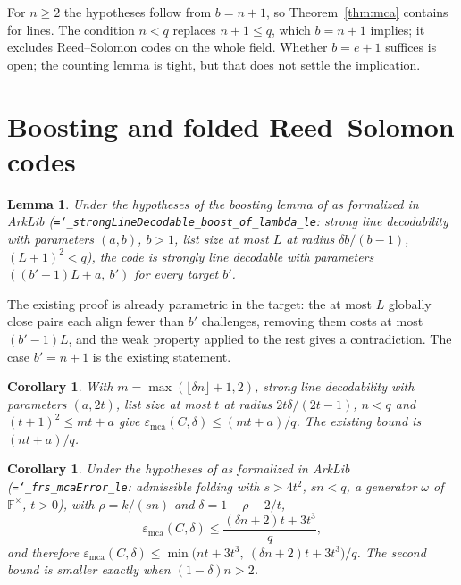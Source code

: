 \documentclass[11pt]{article}
\newtheorem{lemma}[theorem]{Lemma}
\newtheorem{corollary}[theorem]{Corollary}
\theoremstyle{definition}
\theoremstyle{remark}
\newcommand{\F}{\mathbb{F}}
\newcommand{\mca}{\varepsilon_{\mathrm{mca}}}
\newcommand{\lean}[1]{\texttt{\hyphenchar\font=`\_\relax #1}}
\begin{document}
For $n\ge2$ the hypotheses follow from $b=n+1$, so Theorem~\ref{thm:mca} contains
\cite[Thm.~3.5]{GG25} for lines. The condition $n<q$ replaces $n+1\le q$, which $b=n+1$ implies;
it excludes Reed--Solomon codes on the whole field. Whether $b=e+1$ suffices is open; the
counting lemma is tight, but that does not settle the implication.

\section{Boosting and folded Reed--Solomon codes}

\begin{lemma}\label{lem:boost}
Under the hypotheses of the boosting lemma of \cite{GG25} as formalized in ArkLib
(\lean{strongLineDecodable\_boost\_of\_lambda\_le}: strong line decodability with parameters
$(a,b)$, $b>1$, list size at most $L$ at radius $\delta b/(b-1)$, $(L+1)^2<q$), the code is
strongly line decodable with parameters $((b'-1)L+a,\ b')$ for every target $b'$.
\end{lemma}

The existing proof is already parametric in the target: the at most $L$ globally close pairs each
align fewer than $b'$ challenges, removing them costs at most $(b'-1)L$, and the weak property
applied to the rest gives a contradiction. The case $b'=n+1$ is the existing statement.

\begin{corollary}\label{cor:mcaboost}
With $m=\max(\lfloor\delta n\rfloor+1,2)$, strong line decodability with parameters $(a,2t)$, list
size at most $t$ at radius $2t\delta/(2t-1)$, $n<q$ and $(t+1)^2\le mt+a$ give
$\mca(C,\delta)\le(mt+a)/q$. The existing bound is $(nt+a)/q$.
\end{corollary}

\begin{corollary}\label{cor:frs}
Under the hypotheses of \cite[Cor.~4.10]{GG25} as formalized in ArkLib (\lean{frs\_mcaError\_le}:
admissible folding with $s>4t^2$, $sn<q$, a generator $\omega$ of $\F^\times$, $t>0$),
with $\rho=k/(sn)$ and $\delta=1-\rho-2/t$,
\[
\mca(C,\delta)\le\frac{(\delta n+2)t+3t^3}{q},
\]
and therefore $\mca(C,\delta)\le\min\bigl(nt+3t^3,\ (\delta n+2)t+3t^3\bigr)/q$. The second
bound is smaller exactly when $(1-\delta)n>2$.
\end{corollary}
\end{document}

